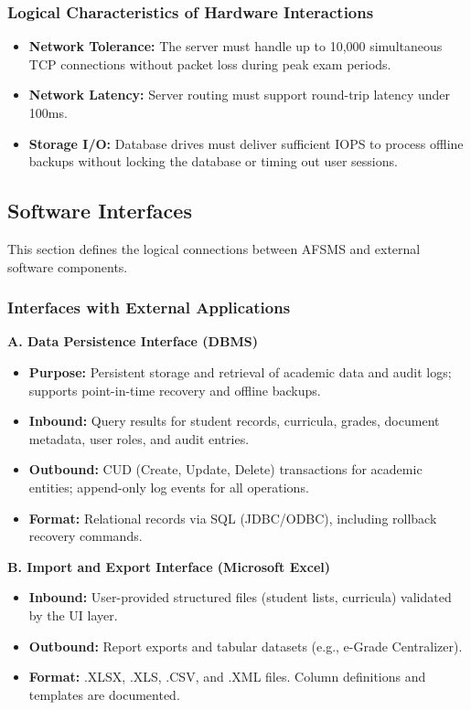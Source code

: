 \documentclass[11pt, a4paper]{article}
\begin{document}
\subsubsection{Logical Characteristics of Hardware Interactions}
\begin{itemize}
    \item \textbf{Network Tolerance:} The server must handle up to 10,000 simultaneous TCP connections without packet loss during peak exam periods.
    \item \textbf{Network Latency:} Server routing must support round-trip latency under 100ms.
    \item \textbf{Storage I/O:} Database drives must deliver sufficient IOPS to process offline backups without locking the database or timing out user sessions.
\end{itemize}

\subsection{Software Interfaces}
This section defines the logical connections between AFSMS and external software components.

\subsubsection{Interfaces with External Applications}

\textbf{A. Data Persistence Interface (DBMS)}
\begin{itemize}
    \item \textbf{Purpose:} Persistent storage and retrieval of academic data and audit logs; supports point-in-time recovery and offline backups.
    \item \textbf{Inbound:} Query results for student records, curricula, grades, document metadata, user roles, and audit entries.
    \item \textbf{Outbound:} CUD (Create, Update, Delete) transactions for academic entities; append-only log events for all operations.
    \item \textbf{Format:} Relational records via SQL (JDBC/ODBC), including rollback recovery commands.
\end{itemize}

\textbf{B. Import and Export Interface (Microsoft Excel)}
\begin{itemize}
    \item \textbf{Inbound:} User-provided structured files (student lists, curricula) validated by the UI layer.
    \item \textbf{Outbound:} Report exports and tabular datasets (e.g., e-Grade Centralizer).
    \item \textbf{Format:} .XLSX, .XLS, .CSV, and .XML files. Column definitions and templates are documented.
\end{itemize}
\end{document}
